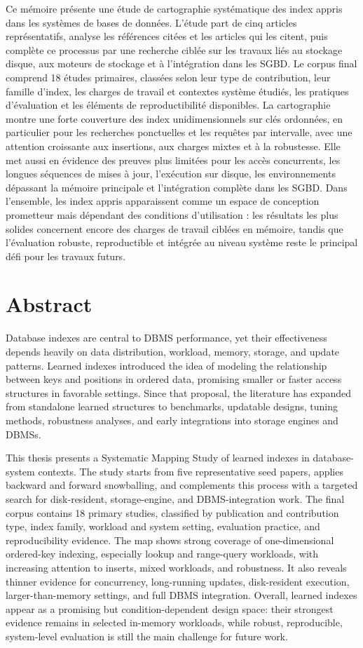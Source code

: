 \documentclass[a4paper, 12pt, twoside]{report}
\begin{document}
Ce mémoire présente une étude de cartographie systématique des index appris dans les systèmes de bases de données. L'étude part de cinq articles représentatifs, analyse les références citées et les articles qui les citent, puis complète ce processus par une recherche ciblée sur les travaux liés au stockage disque, aux moteurs de stockage et à l'intégration dans les SGBD. Le corpus final comprend 18 études primaires, classées selon leur type de contribution, leur famille d'index, les charges de travail et contextes système étudiés, les pratiques d'évaluation et les éléments de reproductibilité disponibles. La cartographie montre une forte couverture des index unidimensionnels sur clés ordonnées, en particulier pour les recherches ponctuelles et les requêtes par intervalle, avec une attention croissante aux insertions, aux charges mixtes et à la robustesse. Elle met aussi en évidence des preuves plus limitées pour les accès concurrents, les longues séquences de mises à jour, l'exécution sur disque, les environnements dépassant la mémoire principale et l'intégration complète dans les SGBD. Dans l'ensemble, les index appris apparaissent comme un espace de conception prometteur mais dépendant des conditions d'utilisation : les résultats les plus solides concernent encore des charges de travail ciblées en mémoire, tandis que l'évaluation robuste, reproductible et intégrée au niveau système reste le principal défi pour les travaux futurs.

\section*{Abstract}
Database indexes are central to DBMS performance, yet their effectiveness depends heavily on data distribution, workload, memory, storage, and update patterns. Learned indexes introduced the idea of modeling the relationship between keys and positions in ordered data, promising smaller or faster access structures in favorable settings. Since that proposal, the literature has expanded from standalone learned structures to benchmarks, updatable designs, tuning methods, robustness analyses, and early integrations into storage engines and DBMSs.

This thesis presents a Systematic Mapping Study of learned indexes in database-system contexts. The study starts from five representative seed papers, applies backward and forward snowballing, and complements this process with a targeted search for disk-resident, storage-engine, and DBMS-integration work. The final corpus contains 18 primary studies, classified by publication and contribution type, index family, workload and system setting, evaluation practice, and reproducibility evidence. The map shows strong coverage of one-dimensional ordered-key indexing, especially lookup and range-query workloads, with increasing attention to inserts, mixed workloads, and robustness. It also reveals thinner evidence for concurrency, long-running updates, disk-resident execution, larger-than-memory settings, and full DBMS integration. Overall, learned indexes appear as a promising but condition-dependent design space: their strongest evidence remains in selected in-memory workloads, while robust, reproducible, system-level evaluation is still the main challenge for future work.
\end{document}
